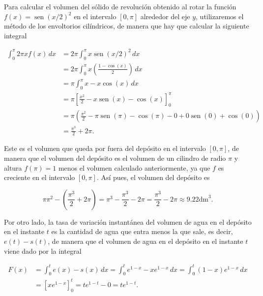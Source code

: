 \documentclass[
  spanish,
  a4paper,
]{scrreport}
\theoremstyle{definition}
\theoremstyle{remark}
\begin{document}
\begin{tcolorbox}[enhanced jigsaw, arc=.35mm, bottomrule=.15mm, bottomtitle=1mm, breakable, colback=white, colbacktitle=quarto-callout-tip-color!10!white, colframe=quarto-callout-tip-color-frame, coltitle=black, left=2mm, leftrule=.75mm, opacityback=0, opacitybacktitle=0.6, rightrule=.15mm, title=\textcolor{quarto-callout-tip-color}{\faLightbulb}\hspace{0.5em}{Solución}, titlerule=0mm, toprule=.15mm, toptitle=1mm]

Para calcular el volumen del sólido de revolución obtenido al rotar la
función \(f(x) = \operatorname{sen}(x/2)^2\) en el intervalo
\([0, \pi]\) alrededor del eje \(y\), utilizaremos el método de los
envoltorios cilíndricos, de manera que hay que calcular la siguiente
integral

\begin{align*}
\int_0^\pi 2\pi xf(x)\, dx 
&= 2\pi \int_0^\pi x\operatorname{sen}(x/2)^2\, dx \\
&= 2\pi \int_0^\pi x\left(\frac{1-\cos(x)}{2}\right)\, dx \\
&= \pi \int_0^\pi x - x\cos(x)\, dx \\
&= \pi \left[\frac{x^2}{2} - x\operatorname{sen}(x) - \cos(x)\right]_0^\pi \\
&= \pi \left(\frac{\pi^2}{2} - \pi\operatorname{sen}(\pi) - \cos(\pi) - 0 + 0\operatorname{sen}(0) + \cos(0) \right)\\
&= \frac{\pi^3}{2} + 2\pi.
\end{align*}

Este es el volumen que queda por fuera del depósito en el intervalo
\([0, \pi]\), de manera que el volumen del depósito es el volumen de un
cilindro de radio \(\pi\) y altura \(f(\pi)=1\) menos el volumen
calculado anteriormente, ya que \(f\) es creciente en el intervalo
\([0, \pi]\). Así pues, el volumen del depósito es

\[
\pi \pi^2 - \left(\frac{\pi^3}{2} + 2\pi\right) = \pi^3 - \frac{\pi^3}{2} - 2\pi = \frac{\pi^3}{2} - 2\pi \approx 9.22 \mbox{dm}^3.
\]

Por otro lado, la tasa de variación instantánea del volumen de agua en
el depósito en el instante \(t\) es la cantidad de agua que entra menos
la que sale, es decir, \(e(t) - s(t)\), de manera que el volumen de agua
en el depósito en el instante \(t\) viene dado por la integral

\begin{align*}
F(x) 
&= \int_0^t e(x) - s(x)\, dx 
= \int_0^t e^{1-x} - xe^{1-x}\, dx 
= \int_0^t (1-x)e^{1-x}\, dx  \\
&= \left[xe^{1-x}\right]_0^t
= te^{1-t} - 0 
= te^{1-t}.
\end{align*}


\end{tcolorbox}
\end{document}
